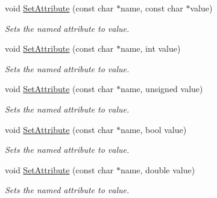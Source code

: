 \begin{DoxyCompactItemize}
\mbox{\label{classtinyxml2_1_1XMLElement_a11943abf2d0831548c3790dd5d9f119c}} 
void \hyperlink{classtinyxml2_1_1XMLElement_a11943abf2d0831548c3790dd5d9f119c}{Set\+Attribute} (const char $\ast$name, const char $\ast$value)
\begin{DoxyCompactList}\small\item\em Sets the named attribute to value. \end{DoxyCompactList}\item 
\mbox{\label{classtinyxml2_1_1XMLElement_aae6568c64c7f1cc88be8461ba41a79cf}} 
void \hyperlink{classtinyxml2_1_1XMLElement_aae6568c64c7f1cc88be8461ba41a79cf}{Set\+Attribute} (const char $\ast$name, int value)
\begin{DoxyCompactList}\small\item\em Sets the named attribute to value. \end{DoxyCompactList}\item 
\mbox{\label{classtinyxml2_1_1XMLElement_ae143997e90064ba82326b29a9930ea8f}} 
void \hyperlink{classtinyxml2_1_1XMLElement_ae143997e90064ba82326b29a9930ea8f}{Set\+Attribute} (const char $\ast$name, unsigned value)
\begin{DoxyCompactList}\small\item\em Sets the named attribute to value. \end{DoxyCompactList}\item 
\mbox{\label{classtinyxml2_1_1XMLElement_aa848b696e6a75e4e545c6da9893b11e1}} 
void \hyperlink{classtinyxml2_1_1XMLElement_aa848b696e6a75e4e545c6da9893b11e1}{Set\+Attribute} (const char $\ast$name, bool value)
\begin{DoxyCompactList}\small\item\em Sets the named attribute to value. \end{DoxyCompactList}\item 
\mbox{\label{classtinyxml2_1_1XMLElement_a233397ee81e70eb5d4b814c5f8698533}} 
void \hyperlink{classtinyxml2_1_1XMLElement_a233397ee81e70eb5d4b814c5f8698533}{Set\+Attribute} (const char $\ast$name, double value)
\begin{DoxyCompactList}\small\item\em Sets the named attribute to value. \end{DoxyCompactList}\item 

\end{DoxyCompactItemize}

